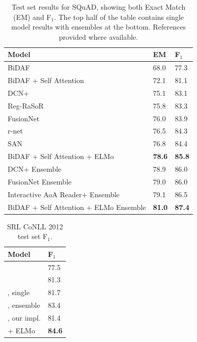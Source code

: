 \documentclass[11pt,a4paper]{article}
\newcommand{\ELMO}{ELMo}
\begin{document}
\begin{table}
\centering
\begin{tabular}{l|l|l}
\textbf{Model}                         & \textbf{EM}       & \textbf{F$_1$} \\ \hline \hline
BiDAF \citep{Seo2016BidirectionalAF}  & 68.0	& 77.3 \\
BiDAF + Self Attention  & 72.1	 & 81.1 \\
DCN+ & 75.1 &	83.1 \\
Reg-RaSoR  & 75.8 &	83.3 \\
FusionNet  & 76.0	 & 83.9 \\
r-net \citep{Wang2017GatedSN} & 76.5 &	84.3 \\
SAN \citep{liu2017stochastic} & 76.8 & 84.4 \\
BiDAF + Self Attention + \ELMO{} & \textbf{78.6}  & \textbf{85.8} \\ \hline
DCN+ Ensemble & 78.9 & 86.0 \\
FusionNet Ensemble & 79.0 & 86.0 \\
Interactive AoA Reader+ Ensemble & 79.1 & 86.5 \\
BiDAF + Self Attention + \ELMO{} Ensemble & \textbf{81.0}  & \textbf{87.4}

\end{tabular}
\caption{Test set results for SQuAD, showing both Exact Match (EM) and F$_1$.  The top half of the table contains single model results with ensembles at the bottom.
References provided where available.
}
\label{table:squad_test}
\end{table}

\begin{table}
\centering
\begin{tabular}{l|l}
\textbf{Model}                                & \textbf{F$_1$} \\ \hline \hline
\citet{Pradhan2013TowardsRL}   & 77.5 \\
\citet{Zhou2015EndtoendLO}                & 81.3     \\
\citet{He2017DeepSR}, single                  & 81.7      \\
\citet{He2017DeepSR}, ensemble     & 83.4  \\ \hline
\citet{He2017DeepSR}, our impl. & 81.4         \\
\citet{He2017DeepSR} + \ELMO             & \textbf{84.6}       \\
\end{tabular}
\caption{SRL CoNLL 2012 test set F$_1$.
}
\label{table:srl_test}
\end{table}
\end{document}
